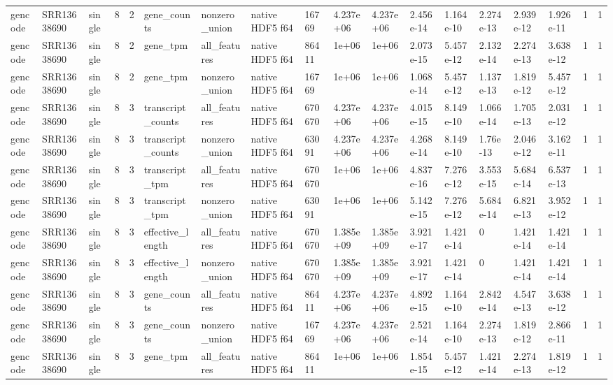 \begin{tabular}{llllllllllllllllll}
gencode & SRR13638690 & single & 8 & 2 & gene\_counts & nonzero\_union & native HDF5 f64 & 16769 & 4.237e+06 & 4.237e+06 & 2.456e-14 & 1.164e-10 & 2.274e-13 & 2.939e-12 & 1.926e-11 & 1 & 1 \\
gencode & SRR13638690 & single & 8 & 2 & gene\_tpm & all\_features & native HDF5 f64 & 86411 & 1e+06 & 1e+06 & 2.073e-15 & 5.457e-12 & 2.132e-14 & 2.274e-13 & 3.638e-12 & 1 & 1 \\
gencode & SRR13638690 & single & 8 & 2 & gene\_tpm & nonzero\_union & native HDF5 f64 & 16769 & 1e+06 & 1e+06 & 1.068e-14 & 5.457e-12 & 1.137e-13 & 1.819e-12 & 5.457e-12 & 1 & 1 \\
gencode & SRR13638690 & single & 8 & 3 & transcript\_counts & all\_features & native HDF5 f64 & 670670 & 4.237e+06 & 4.237e+06 & 4.015e-15 & 8.149e-10 & 1.066e-14 & 1.705e-13 & 2.031e-12 & 1 & 1 \\
gencode & SRR13638690 & single & 8 & 3 & transcript\_counts & nonzero\_union & native HDF5 f64 & 63091 & 4.237e+06 & 4.237e+06 & 4.268e-14 & 8.149e-10 & 1.76e-13 & 2.046e-12 & 3.162e-11 & 1 & 1 \\
gencode & SRR13638690 & single & 8 & 3 & transcript\_tpm & all\_features & native HDF5 f64 & 670670 & 1e+06 & 1e+06 & 4.837e-16 & 7.276e-12 & 3.553e-15 & 5.684e-14 & 6.537e-13 & 1 & 1 \\
gencode & SRR13638690 & single & 8 & 3 & transcript\_tpm & nonzero\_union & native HDF5 f64 & 63091 & 1e+06 & 1e+06 & 5.142e-15 & 7.276e-12 & 5.684e-14 & 6.821e-13 & 3.952e-12 & 1 & 1 \\
gencode & SRR13638690 & single & 8 & 3 & effective\_length & all\_features & native HDF5 f64 & 670670 & 1.385e+09 & 1.385e+09 & 3.921e-17 & 1.421e-14 & 0 & 1.421e-14 & 1.421e-14 & 1 & 1 \\
gencode & SRR13638690 & single & 8 & 3 & effective\_length & nonzero\_union & native HDF5 f64 & 670670 & 1.385e+09 & 1.385e+09 & 3.921e-17 & 1.421e-14 & 0 & 1.421e-14 & 1.421e-14 & 1 & 1 \\
gencode & SRR13638690 & single & 8 & 3 & gene\_counts & all\_features & native HDF5 f64 & 86411 & 4.237e+06 & 4.237e+06 & 4.892e-15 & 1.164e-10 & 2.842e-14 & 4.547e-13 & 3.638e-12 & 1 & 1 \\
gencode & SRR13638690 & single & 8 & 3 & gene\_counts & nonzero\_union & native HDF5 f64 & 16769 & 4.237e+06 & 4.237e+06 & 2.521e-14 & 1.164e-10 & 2.274e-13 & 1.819e-12 & 2.866e-11 & 1 & 1 \\
gencode & SRR13638690 & single & 8 & 3 & gene\_tpm & all\_features & native HDF5 f64 & 86411 & 1e+06 & 1e+06 & 1.854e-15 & 5.457e-12 & 1.421e-14 & 2.274e-13 & 1.819e-12 & 1 & 1 \\

\end{tabular}

